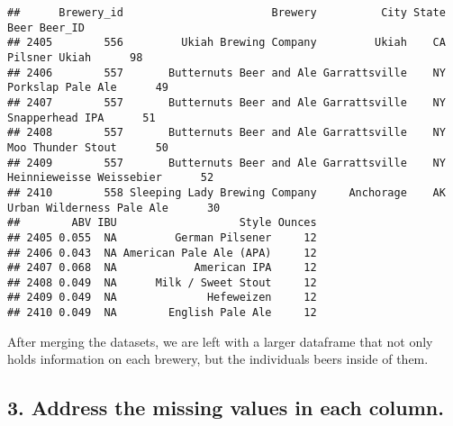 \documentclass[
]{article}
\begin{document}
\begin{verbatim}
##      Brewery_id                       Brewery          City State                      Beer Beer_ID
## 2405        556         Ukiah Brewing Company         Ukiah    CA             Pilsner Ukiah      98
## 2406        557       Butternuts Beer and Ale Garrattsville    NY         Porkslap Pale Ale      49
## 2407        557       Butternuts Beer and Ale Garrattsville    NY           Snapperhead IPA      51
## 2408        557       Butternuts Beer and Ale Garrattsville    NY         Moo Thunder Stout      50
## 2409        557       Butternuts Beer and Ale Garrattsville    NY  Heinnieweisse Weissebier      52
## 2410        558 Sleeping Lady Brewing Company     Anchorage    AK Urban Wilderness Pale Ale      30
##        ABV IBU                   Style Ounces
## 2405 0.055  NA         German Pilsener     12
## 2406 0.043  NA American Pale Ale (APA)     12
## 2407 0.068  NA            American IPA     12
## 2408 0.049  NA      Milk / Sweet Stout     12
## 2409 0.049  NA              Hefeweizen     12
## 2410 0.049  NA        English Pale Ale     12
\end{verbatim}

After merging the datasets, we are left with a larger dataframe that not
only holds information on each brewery, but the individuals beers inside
of them.

\hypertarget{address-the-missing-values-in-each-column.}{%
\subsection{3. Address the missing values in each
column.}\label{address-the-missing-values-in-each-column.}}
\end{document}
